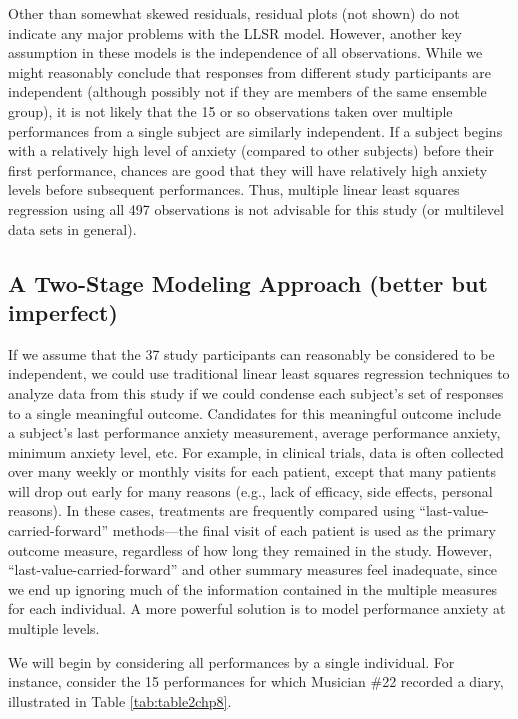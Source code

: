 \documentclass[
]{krantz}
\begin{document}
Other than somewhat skewed residuals, residual plots (not shown) do not indicate any major problems with the LLSR model. However, another key assumption in these models is the independence of all observations. While we might reasonably conclude that responses from different study participants are independent (although possibly not if they are members of the same ensemble group), it is not likely that the 15 or so observations taken over multiple performances from a single subject are similarly independent. If a subject begins with a relatively high level of anxiety (compared to other subjects) before their first performance, chances are good that they will have relatively high anxiety levels before subsequent performances. Thus, multiple linear least squares regression using all 497 observations is not advisable for this study (or multilevel data sets in general).

\subsection{A Two-Stage Modeling Approach (better but imperfect)}\label{twostage}

If we assume that the 37 study participants can reasonably be considered to be independent, we could use traditional linear least squares regression techniques to analyze data from this study if we could condense each subject's set of responses to a single meaningful outcome. Candidates for this meaningful outcome include a subject's last performance anxiety measurement, average performance anxiety, minimum anxiety level, etc. For example, in clinical trials, data is often collected over many weekly or monthly visits for each patient, except that many patients will drop out early for many reasons (e.g., lack of efficacy, side effects, personal reasons). In these cases, treatments are frequently compared using ``last-value-carried-forward'' methods---the final visit of each patient is used as the primary outcome measure, regardless of how long they remained in the study. However, ``last-value-carried-forward'' and other summary measures feel inadequate, since we end up ignoring much of the information contained in the multiple measures for each individual. A more powerful solution is to model performance anxiety at multiple levels.

We will begin by considering all performances by a single individual. For instance, consider the 15 performances for which Musician \#22 recorded a diary, illustrated in Table \ref{tab:table2chp8}.
\end{document}
